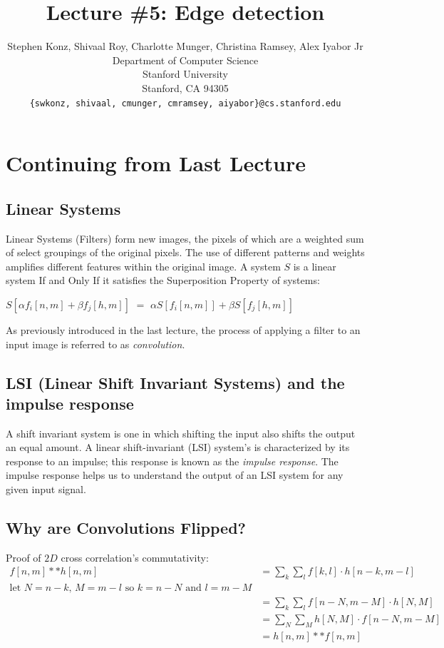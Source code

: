 \documentclass{article}
\title{Lecture \#5: Edge detection}
\author{
  Stephen Konz, Shivaal Roy, Charlotte Munger, Christina Ramsey, Alex Iyabor Jr \\
  Department of Computer Science\\
  Stanford University\\
  Stanford, CA 94305 \\
  \texttt{\{swkonz, shivaal, cmunger, cmramsey, aiyabor\}@cs.stanford.edu} \\
}
\begin{document}
\maketitle


\section{Continuing from Last Lecture}
\subsection{Linear Systems}
Linear Systems (Filters) form new images, the pixels of which are a weighted sum of select groupings of the original pixels. The use of different patterns and weights amplifies different features within the original image. A system  $S$ is a linear system If and Only If it satisfies the Superposition Property of systems:
\begin{center}
$S[\alpha f_i[n,m] + \beta f_j[h,m]]$ $=$ $\alpha S[f_i[n,m]] + \beta S[f_j[h,m]]$
\end{center}

As previously introduced in the last lecture, the process of applying a filter to an input image is referred to as \textit{convolution}.

\subsection{LSI (Linear Shift Invariant Systems) and the impulse response}
A shift invariant system is one in which shifting the input also shifts the output an equal amount. A linear shift-invariant (LSI) system's is characterized by its response to an impulse; this response is known as the \textit{impulse response}. The impulse response helps us to understand the output of an LSI system for any given input signal.

\subsection{Why are Convolutions Flipped?}
Proof of $2D$ cross correlation's commutativity:
\begin{align*}
f[n,m] * * h[n,m] &= \sum_{k}^{} \sum_{l}^{} f[k,l] \cdot h[n-k,m-l]\\
\text{let $N = n - k$, $M = m-l$ so $k = n - N$ and $l = m - M$} \\
&= \sum_{k}^{} \sum_{l}^{} f[n-N, m-M] \cdot h[N,M]\\
&= \sum_{N}^{} \sum_{M}^{} h[N,M] \cdot f[n-N, m-M]\\
&= h[n,m] * * f[n,m]
\end{align*}
\end{document}
